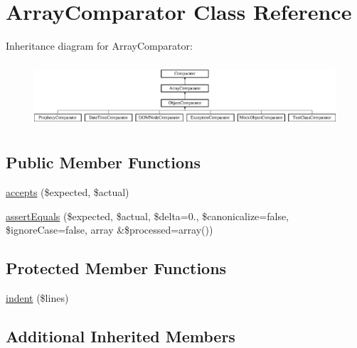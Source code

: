 \hypertarget{class_sebastian_bergmann_1_1_comparator_1_1_array_comparator}{}\section{Array\+Comparator Class Reference}
\label{class_sebastian_bergmann_1_1_comparator_1_1_array_comparator}
Inheritance diagram for Array\+Comparator\+:\begin{figure}[H]
\begin{center}
\leavevmode
\includegraphics[height=2.424242cm]{class_sebastian_bergmann_1_1_comparator_1_1_array_comparator}
\end{center}
\end{figure}
\subsection*{Public Member Functions}
\begin{DoxyCompactItemize}
\item 
\mbox{\hyperlink{class_sebastian_bergmann_1_1_comparator_1_1_array_comparator_ae9bdf0cba02ce3470169280656cdeb84}{accepts}} (\$expected, \$actual)
\item 
\mbox{\hyperlink{class_sebastian_bergmann_1_1_comparator_1_1_array_comparator_a85a7369896910cf1d55e31d477c29f1e}{assert\+Equals}} (\$expected, \$actual, \$delta=0., \$canonicalize=false, \$ignore\+Case=false, array \&\$processed=array())
\end{DoxyCompactItemize}
\subsection*{Protected Member Functions}
\begin{DoxyCompactItemize}
\item 
\mbox{\hyperlink{class_sebastian_bergmann_1_1_comparator_1_1_array_comparator_a500a595b9062b1b18236c42df8cd9d33}{indent}} (\$lines)
\end{DoxyCompactItemize}
\subsection*{Additional Inherited Members}


